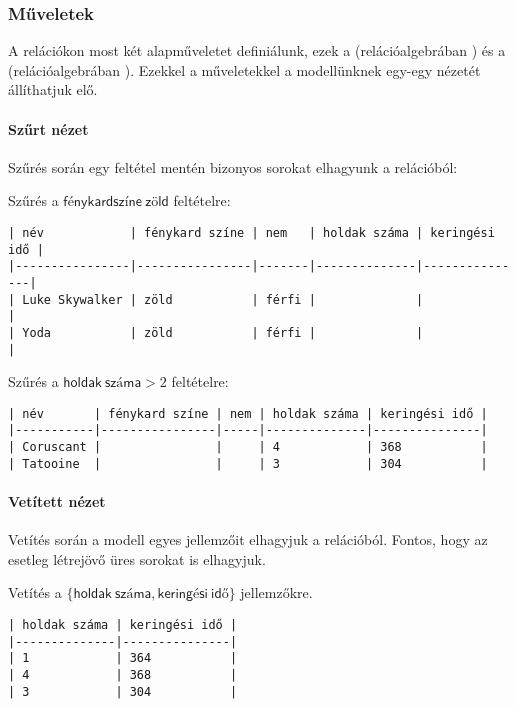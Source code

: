 \subsubsection{Műveletek}

A relációkon most két alapműveletet definiálunk, ezek a  (relációalgebrában ) és a  (relációalgebrában ). Ezekkel a műveletekkel a modellünknek egy-egy nézetét állíthatjuk elő.

\paragraph{Szűrt nézet}

Szűrés során egy feltétel mentén bizonyos sorokat elhagyunk a relációból:

Szűrés a $\mathsf{fénykard színe\: zöld}$ feltételre:

\begin{verbatim}
| név            | fénykard színe | nem   | holdak száma | keringési idő |
|----------------|----------------|-------|--------------|---------------|
| Luke Skywalker | zöld           | férfi |              |               |
| Yoda           | zöld           | férfi |              |               |
\end{verbatim}

Szűrés a $\mathsf{holdak\: száma} > 2$ feltételre:

\begin{verbatim}
| név       | fénykard színe | nem | holdak száma | keringési idő |
|-----------|----------------|-----|--------------|---------------|
| Coruscant |                |     | 4            | 368           |
| Tatooine  |                |     | 3            | 304           |
\end{verbatim}

\paragraph{Vetített nézet}

Vetítés során a modell egyes jellemzőit elhagyjuk a relációból. Fontos, hogy az esetleg létrejövő üres sorokat is elhagyjuk.

Vetítés a $\{\mathsf{holdak\: száma, keringési\: idő\}}$ jellemzőkre.

\begin{verbatim}
| holdak száma | keringési idő |
|--------------|---------------|
| 1            | 364           |
| 4            | 368           |
| 3            | 304           |
\end{verbatim}

